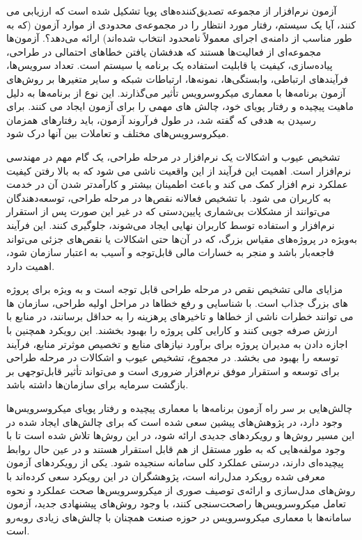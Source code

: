 آزمون نرم‌افزار از مجموعه تصدیق‌کننده‌های پویا تشکیل شده است که ارزیابی می کنند، آیا یک سیستم، رفتار مورد انتظار را در مجموعه‌ی محدودی از موارد آزمون (که به طور مناسب از دامنه‌ی اجرای معمولاً نامحدود انتخاب شده‌اند) ارائه می‌دهد؟. آزمون‌ها مجموعه‌ای از فعالیت‌ها هستند که هدفشان یافتن خطاهای احتمالی در طراحی، پیاده‌سازی، کیفیت یا قابلیت استفاده یک برنامه یا سیستم است. تعداد سرویس‌ها، فرآیندهای ارتباطی، وابستگی‌ها، نمونه‌ها، ارتباطات شبکه و سایر متغیرها بر روش‌های آزمون برنامه‌ها با معماری میکروسرویس تأثیر می‌گذارند. این نوع از برنامه‌ها به دلیل ماهیت پیچیده و رفتار پویای خود، چالش های مهمی را برای آزمون ایجاد می کنند. برای رسیدن به هدفی که گفته شد، در طول فرآروند آزمون، باید رفتارهای همزمان میکروسرویس‌های مختلف و تعاملات بین آنها درک شود. 


تشخیص عیوب و اشکالات یک نرم‌افزار در مرحله طراحی، یک گام مهم در مهندسی نرم‌افزار است. اهمیت این فرآیند از این واقعیت ناشی می شود که به بالا رفتن کیفیت عملکرد نرم افزار کمک می کند و باعث اطمینان بیشتر و کارآمدتر شدن آن در خدمت به کاربران می شود. با تشخیص فعالانه نقص‌ها در مرحله طراحی، توسعه‌دهندگان می‌توانند از مشکلات بی‌شماری پایین‌دستی که در غیر این صورت پس از استقرار نرم‌افزار و استفاده توسط کاربران نهایی ایجاد می‌شوند، جلوگیری کنند. این فرآیند به‌ویژه در پروژه‌های مقیاس بزرگ، که در آن‌ها حتی اشکالات یا نقص‌های جزئی می‌تواند فاجعه‌بار باشد و منجر به خسارات مالی قابل‌توجه و آسیب به اعتبار سازمان شود، اهمیت دارد.

مزایای مالی تشخیص نقص در مرحله طراحی قابل توجه است و به ویژه برای پروژه های بزرگ جذاب است. با شناسایی و رفع خطاها در مراحل اولیه طراحی، سازمان ها می توانند خطرات ناشی از خطاها و تاخیرهای پرهزینه را به حداقل برسانند، در منابع با ارزش صرفه جویی کنند و کارایی کلی پروژه را بهبود بخشند. این رویکرد همچنین با اجازه دادن به مدیران پروژه برای برآورد نیازهای منابع و تخصیص موثرتر منابع، فرآیند توسعه را بهبود می بخشد. در مجموع، تشخیص عیوب و اشکالات در مرحله طراحی برای توسعه و استقرار موفق نرم‌افزار ضروری است و می‌تواند تأثیر قابل‌توجهی بر بازگشت سرمایه برای سازمان‌ها داشته باشد.

چالش‌هایی بر سر راه آزمون برنامه‌ها با معماری پیچیده و رفتار پویای میکروسرویس‌ها وجود دارد، در پژوهش‌های پیشین سعی شده است که برای چالش‌های ایجاد شده در این مسیر روش‌ها و رویکردهای جدیدی ارائه شود، در این روش‌ها تلاش شده است تا با وجود مولفه‌هایی که به طور مستقل از هم قابل استقرار هستند و در عین حال روابط پیچیده‌ای دارند، درستی عملکرد کلی سامانه سنجیده شود. یکی از رویکردهای آزمون معرفی شده رویکرد مدل‌رانه است، پژوهشگران در این رویکرد سعی کرده‌اند با روش‌های مدل‌سازی و ارائه‌ی توصیف صوری از میکروسرویس‌ها صحت عملکرد و نحوه تعامل میکروسرویس‌ها راصحت‌سنجی کنند، با وجود روش‌های پیشنهادی جدید، آزمون سامانه‌ها با معماری میکروسرویس در حوزه صنعت همچنان با چالش‌های زیادی روبه‌رو است. 


